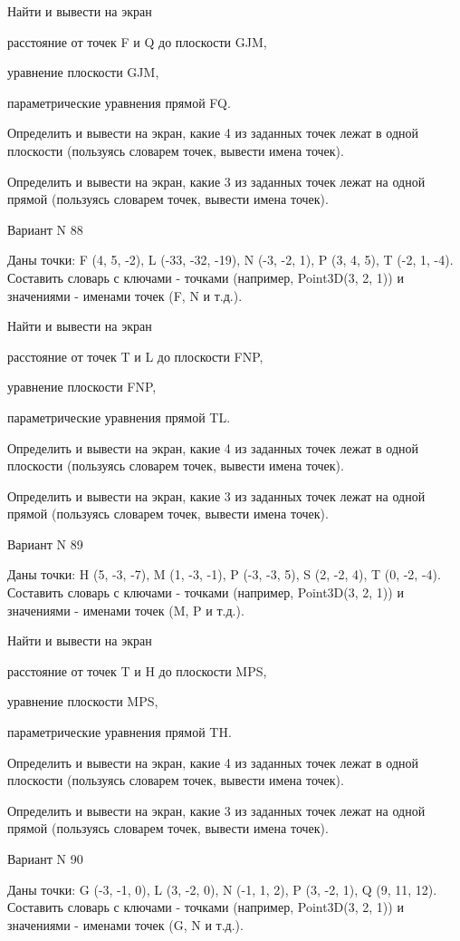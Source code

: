 \documentclass[11pt]{report}
\begin{document}
Найти и вывести на экран


расстояние от точек F и Q до плоскости GJM,


уравнение плоскости GJM,


параметрические уравнения прямой FQ.


Определить и вывести на экран, какие 4 из заданных точек лежат в одной плоскости (пользуясь словарем точек, вывести имена точек).


Определить и вывести на экран, какие 3 из заданных точек лежат на одной прямой (пользуясь словарем точек, вывести имена точек).

\newpage
Вариант N 88

Даны точки: F (4, 5, -2), L (-33, -32, -19), N (-3, -2, 1), P (3, 4, 5), T (-2, 1, -4).
Составить словарь с ключами - точками (например, Point3D(3, 2, 1)) и значениями - именами точек (F, N и т.д.).


Найти и вывести на экран


расстояние от точек T и L до плоскости FNP,


уравнение плоскости FNP,


параметрические уравнения прямой TL.


Определить и вывести на экран, какие 4 из заданных точек лежат в одной плоскости (пользуясь словарем точек, вывести имена точек).


Определить и вывести на экран, какие 3 из заданных точек лежат на одной прямой (пользуясь словарем точек, вывести имена точек).

\newpage
Вариант N 89

Даны точки: H (5, -3, -7), M (1, -3, -1), P (-3, -3, 5), S (2, -2, 4), T (0, -2, -4).
Составить словарь с ключами - точками (например, Point3D(3, 2, 1)) и значениями - именами точек (M, P и т.д.).


Найти и вывести на экран


расстояние от точек T и H до плоскости MPS,


уравнение плоскости MPS,


параметрические уравнения прямой TH.


Определить и вывести на экран, какие 4 из заданных точек лежат в одной плоскости (пользуясь словарем точек, вывести имена точек).


Определить и вывести на экран, какие 3 из заданных точек лежат на одной прямой (пользуясь словарем точек, вывести имена точек).

\newpage
Вариант N 90

Даны точки: G (-3, -1, 0), L (3, -2, 0), N (-1, 1, 2), P (3, -2, 1), Q (9, 11, 12).
Составить словарь с ключами - точками (например, Point3D(3, 2, 1)) и значениями - именами точек (G, N и т.д.).
\end{document}
